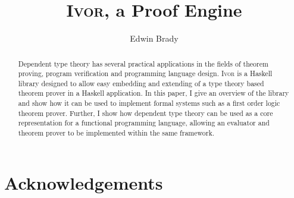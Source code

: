 \documentclass[orivec,dvips,10pt]{llncs}
\newcommand{\Ivor}{\textsc{Ivor}}
\begin{document}
\title{\Ivor{}, a Proof Engine}
\author{Edwin Brady}

 
\maketitle

\begin{abstract}
Dependent type theory has several practical applications in the fields
of theorem proving, program verification and programming language
design. \Ivor{} is a Haskell library designed to allow easy embedding
and extending of a type theory based theorem prover in a Haskell
application. In this paper, I give an overview of the library and show
how it can be used to implement formal systems such as a first order
logic theorem prover.  Further, I show how dependent type theory
can be used as a core representation for a functional programming
language, allowing an evaluator and theorem prover to be implemented
within the same framework.

\end{abstract}





%







\section*{Acknowledgements}



\begin{small}


%

\end{small}
\end{document}
